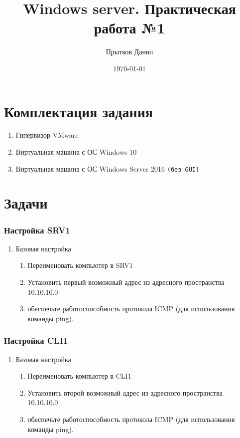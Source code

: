 \documentclass[a4paper, 12pt]{report}
\author{Прытков Данил}
\title{Windows server. Практическая работа №1}
\date{\today}
\begin{document}
	
	\maketitle
	\clearpage

	\section{Комплектация задания}

	\begin{enumerate}
		\item Гипервизор VMware
		\item Виртуальная машина с ОС Windows 10
		\item Виртуальная машина с ОС Windows Server 2016 \texttt{(без GUI)}
	\end{enumerate}

	\section{Задачи}
	
	\subsubsection{Настройка SRV1}
	
	\begin{enumerate}
		\item Базовая настройка
		\begin{enumerate}
			\item Переименовать компьютер в SRV1
			\item Установить первый возможный адрес из адресного пространства 10.10.10.0
			\item обеспечьте работоспособность протокола ICMP (для использования команды ping).
		\end{enumerate}
	\end{enumerate}

	\subsubsection{Настройка CLI1}

	\begin{enumerate}
		\item Базовая настройка
		\begin{enumerate}
			\item Переименовать компьютер в CLI1
			\item Установить второй возможный адрес из адресного пространства 10.10.10.0
			\item обеспечьте работоспособность протокола ICMP (для использования команды ping).
		\end{enumerate}
	\end{enumerate}
\end{document}
